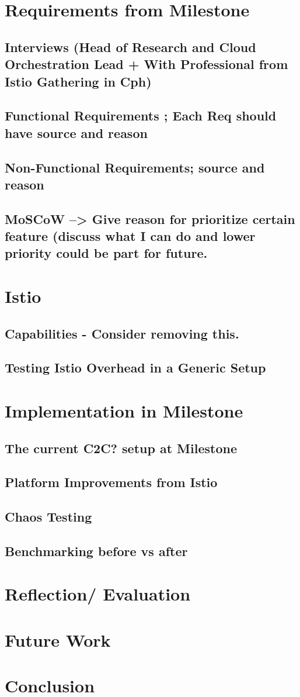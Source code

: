 \section{Requirements from Milestone}
\subsection{Interviews (Head of Research and Cloud Orchestration Lead + With Professional from Istio Gathering in Cph)} 
\subsection{Functional Requirements ; Each Req should have source and reason}
\subsection{Non-Functional Requirements; source and reason}
\subsection{MoSCoW --> Give reason for prioritize certain feature (discuss what I can do and lower priority could be part for future.}
\section{Istio}
\subsection{Capabilities - Consider removing this. }
\subsection{Testing Istio Overhead in a Generic Setup}

\section{Implementation in Milestone}
\subsection{The current C2C? setup at Milestone}
\subsection{Platform Improvements from Istio}
\subsection{Chaos Testing}
\subsection{Benchmarking before vs after}
\section{Reflection/ Evaluation}
\section{Future Work}
\section{Conclusion}




